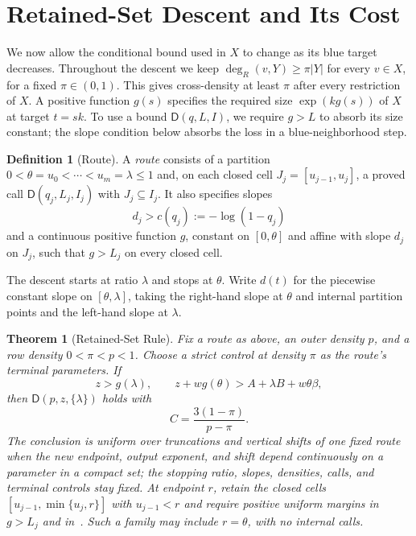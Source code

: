 \documentclass[11pt]{article}
\newtheorem{theorem}{Theorem}
\theoremstyle{definition}
\newtheorem{definition}[lemma]{Definition}
\newcommand{\DD}{\mathsf D}
\begin{document}
\section{Retained-Set Descent and Its Cost}\label{sec:routes}
We now allow the conditional bound used in $X$ to change as its blue target decreases.
Throughout the descent we keep $\deg_R(v,Y)\ge\pi|Y|$ for every $v\in X$, for a fixed $\pi\in(0,1)$.
This gives cross-density at least $\pi$ after every restriction of $X$.
A positive function $g(s)$ specifies the required size $\exp(kg(s))$ of $X$ at target $t=sk$.
To use a bound $\DD(q,L,I)$, we require $g>L$ to absorb its size constant; the slope condition below absorbs the loss in a blue-neighborhood step.
\begin{definition}[Route]\label{def:route}
A \emph{route} consists of a partition
$0<\theta=u_0<\cdots<u_m=\lambda\le1$ and, on each closed cell $J_j=[u_{j-1},u_j]$, a proved call $\DD(q_j,L_j,I_j)$ with $J_j\subseteq I_j$.
It also specifies slopes
\[
 d_j>c(q_j):=-\log(1-q_j)
\]
and a continuous positive function $g$, constant on $[0,\theta]$ and affine with slope $d_j$ on $J_j$, such that $g>L_j$ on every closed cell.
\end{definition}
The descent starts at ratio $\lambda$ and stops at $\theta$.
Write $d(t)$ for the piecewise constant slope on $[\theta,\lambda]$, taking the right-hand slope at $\theta$ and internal partition points and the left-hand slope at $\lambda$.

\begin{theorem}[Retained-Set Rule]\label{thm:route}
Fix a route as above, an outer density $p$, and a row density $0<\pi<p<1$.
Choose a strict control at density $\pi$ as the route's \emph{terminal parameters}.
If
\begin{equation}\label{eq:route-test}
 z>g(\lambda),\qquad
 z+w g(\theta)>A+\lambda B+w\theta\beta,
\end{equation}
then $\DD(p,z,\{\lambda\})$ holds with
\begin{equation}\label{eq:C}
 C=\frac{3(1-\pi)}{p-\pi}.
\end{equation}
The conclusion is uniform over truncations and vertical shifts of one fixed route when the new endpoint, output exponent, and shift depend continuously on a parameter in a compact set; the stopping ratio, slopes, densities, calls, and terminal controls stay fixed.
At endpoint $r$, retain the closed cells $[u_{j-1},\min\{u_j,r\}]$ with $u_{j-1}<r$ and require positive uniform margins in $g>L_j$ and in~.
Such a family may include $r=\theta$, with no internal calls.
\end{theorem}
\end{document}
